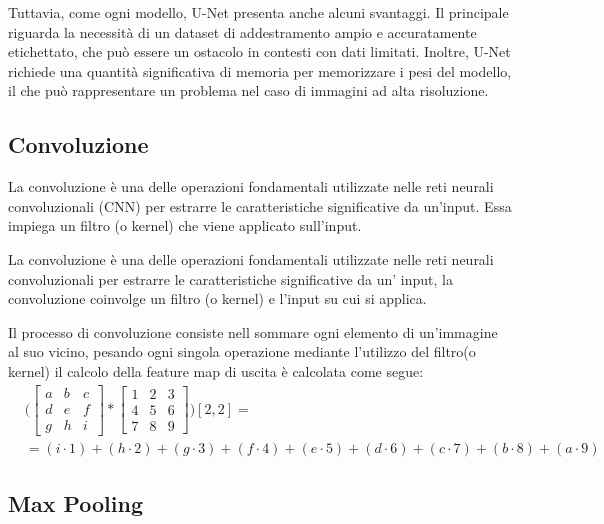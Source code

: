 Tuttavia, come ogni modello, U-Net presenta anche alcuni svantaggi. Il principale riguarda la
necessità di un dataset di addestramento ampio e accuratamente etichettato, che può essere un
ostacolo in contesti con dati limitati. Inoltre, U-Net richiede una quantità significativa di
memoria per memorizzare i pesi del modello, il che può rappresentare un problema nel caso di
immagini ad alta risoluzione.


\subsection{Convoluzione}
\label{sec:convoluzione}

La convoluzione è una delle operazioni fondamentali utilizzate nelle reti neurali convoluzionali
(CNN) per estrarre le caratteristiche significative da un'input. Essa impiega un filtro (o kernel)
che viene applicato sull'input.

La convoluzione è una delle operazioni fondamentali utilizzate nelle reti
neurali convoluzionali per estrarre le caratteristiche significative da un'
input, la convoluzione coinvolge un filtro (o kernel) e l'input su cui si
applica.

Il processo di convoluzione consiste nell sommare ogni elemento di un'immagine
al suo vicino, pesando ogni singola operazione mediante l'utilizzo del filtro(o
kernel) il calcolo della feature map di uscita è calcolata come segue:
\begin{align}
	 & \Bigg( \begin{bmatrix}
		          a & b & c \\
		          d & e & f \\
		          g & h & i
	          \end{bmatrix}
	*
	\begin{bmatrix}
		1 & 2 & 3 \\
		4 & 5 & 6 \\
		7 & 8 & 9
	\end{bmatrix}
	\Bigg) [2, 2] =                                                                                                                  \\
	 & = (i \cdot 1) + (h \cdot 2) + (g \cdot 3) + (f \cdot 4) + (e \cdot 5) + (d \cdot 6) + (c \cdot 7) + (b \cdot 8) + (a \cdot 9)
\end{align}


\subsection{Max Pooling}
\label{sec:max_pooling}

